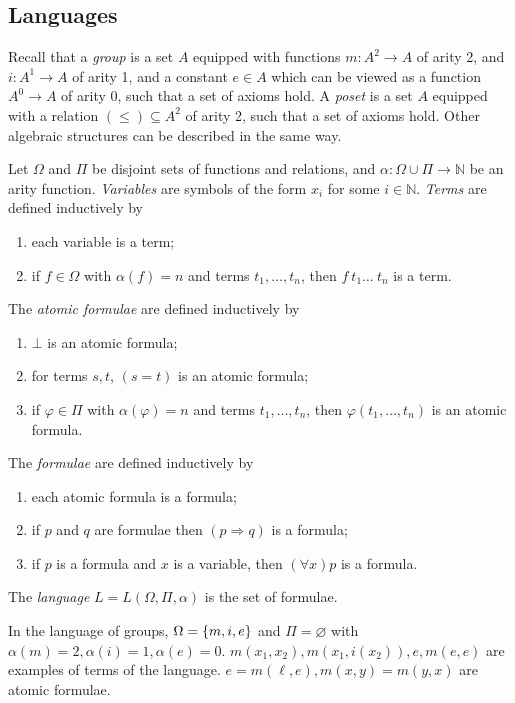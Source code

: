 \subsection{Languages}
Recall that a \emph{group} is a set \( A \) equipped with functions \( m \colon A^2 \to A \) of arity 2, and \( i \colon A^1 \to A \) of arity 1, and a constant \( e \in A \) which can be viewed as a function \( A^0 \to A \) of arity 0, such that a set of axioms hold.
A \emph{poset} is a set \( A \) equipped with a relation \( (\leq) \subseteq A^2 \) of arity 2, such that a set of axioms hold.
Other algebraic structures can be described in the same way.

Let \( \Omega \) and \( \Pi \) be disjoint sets of functions and relations, and \( \alpha \colon \Omega \cup \Pi \to \mathbb N \) be an arity function.
\emph{Variables} are symbols of the form \( x_i \) for some \( i \in \mathbb N \).
\emph{Terms} are defined inductively by
\begin{enumerate}
    \item each variable is a term;
    \item if \( f \in \Omega \) with \( \alpha(f) = n \) and terms \( t_1, \dots, t_n \), then \( f\ t_1\dots\ t_n \) is a term.
\end{enumerate}
The \emph{atomic formulae} are defined inductively by
\begin{enumerate}
    \item \( \bot \) is an atomic formula;
    \item for terms \( s, t \), \( (s = t) \) is an atomic formula;
    \item if \( \varphi \in \Pi \) with \( \alpha(\varphi) = n \) and terms \( t_1, \dots, t_n \), then \( \varphi(t_1, \dots, t_n) \) is an atomic formula.
\end{enumerate}
The \emph{formulae} are defined inductively by
\begin{enumerate}
    \item each atomic formula is a formula;
    \item if \( p \) and \( q \) are formulae then \( (p \Rightarrow q) \) is a formula;
    \item if \( p \) is a formula and \( x \) is a variable, then \( (\forall x) p \) is a formula.
\end{enumerate}
The \emph{language} \( L = L(\Omega, \Pi, \alpha) \) is the set of formulae.
\begin{example}
    In the language of groups, \( \Omega = \qty{m, i, e} \) and \( \Pi = \varnothing \) with \( \alpha(m) = 2, \alpha(i) = 1, \alpha(e) = 0 \).
    \( m(x_1, x_2), m(x_1, i(x_2)), e, m(e, e) \) are examples of terms of the language.
    \( e = m(\ell, e), m(x,y) = m(y,x) \) are atomic formulae.
\end{example}
